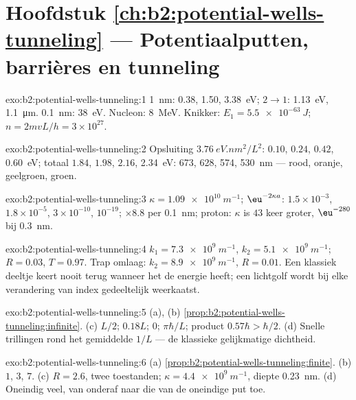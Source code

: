 \section*{Hoofdstuk \ref{ch:b2:potential-wells-tunneling} ---
Potentiaalputten, barrières en tunneling}

\begin{solution}{exo:b2:potential-wells-tunneling:1}
\qty{1}{nm}: \qty{0.38}{}, \qty{1.50}{}, \qty{3.38}{eV}; $2 \to 1$:
\qty{1.13}{eV}, \qty{1.1}{\micro m}.
\qty{0.1}{nm}: \qty{38}{eV}. Nucleon: \qty{8}{MeV}. Knikker:
$E_1 = \qty{5.5e-63}{J}$;
$n = 2mvL/h = 3 \times 10^{27}$.
\end{solution}

\begin{solution}{exo:b2:potential-wells-tunneling:2}
Opsluiting $\qty{3.76}{eV.nm^2}/L^2$: $0.10$, $0.24$, $0.42$, \qty{0.60}{eV}; totaal
$1.84$, $1.98$, $2.16$, \qty{2.34}{eV}: \qty{673}{}, \qty{628}{},
\qty{574}{}, \qty{530}{nm} ---
rood, oranje, geelgroen, groen.
\end{solution}

\begin{solution}{exo:b2:potential-wells-tunneling:3}
$\kappa = \qty{1.09e10}{m^{-1}}$; $\eu^{-2\kappa a}$: $1.5 \times 10^{-3}$,
$1.8 \times 10^{-5}$,
$3 \times 10^{-10}$, $10^{-19}$; $\times 8.8$ per \qty{0.1}{nm}; proton: $\kappa$ is
$43$ keer groter, $\eu^{-280}$ bij \qty{0.3}{nm}.
\end{solution}

\begin{solution}{exo:b2:potential-wells-tunneling:4}
$k_1 = \qty{7.3e9}{m^{-1}}$, $k_2 = \qty{5.1e9}{m^{-1}}$; $R = 0.03$,
$T = 0.97$. Trap
omlaag: $k_2 = \qty{8.9e9}{m^{-1}}$, $R = 0.01$. Een klassiek deeltje keert nooit
terug wanneer het de energie heeft; een lichtgolf wordt bij elke verandering van
index gedeeltelijk weerkaatst.
\end{solution}

\begin{solution}{exo:b2:potential-wells-tunneling:5}
(a), (b) \cref{prop:b2:potential-wells-tunneling:infinite}. (c) $L/2$;
$0.18L$; $0$; $\pi\hbar/L$; product $0.57\hbar > \hbar/2$. (d) Snelle
trillingen rond het gemiddelde $1/L$ --- de klassieke gelijkmatige dichtheid.
\end{solution}

\begin{solution}{exo:b2:potential-wells-tunneling:6}
(a) \cref{prop:b2:potential-wells-tunneling:finite}. (b) $1$, $3$, $7$.
(c) $R = 2.6$, twee toestanden; $\kappa = \qty{4.4e9}{m^{-1}}$, diepte
\qty{0.23}{nm}. (d)
Oneindig veel, van onderaf naar die van de oneindige put toe.
\end{solution}


